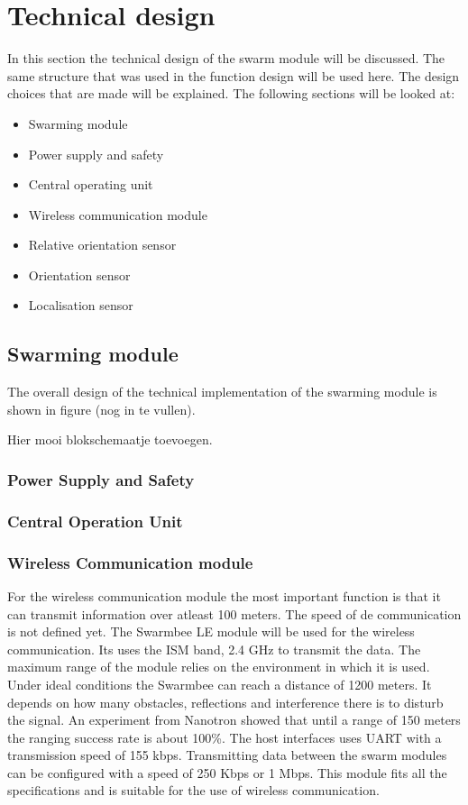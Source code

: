 \documentclass[10pt,a4paper]{article}
\begin{document}
\newpage

\section{Technical design}
 
In this section the technical design of the swarm module will be discussed. The same structure that was used in the function design will be used here. The design choices that are made will be explained. The following sections will be looked at: 


\begin{itemize}
\setlength\itemsep{0em}
\item Swarming module
\item Power supply and safety
\item Central operating unit
\item Wireless communication module
\item Relative orientation sensor
\item Orientation sensor
\item Localisation sensor
\end{itemize}

\subsection{Swarming module}

The overall design of the technical implementation of the swarming module is shown in figure (nog in te vullen). 

Hier mooi blokschemaatje toevoegen. 


\subsubsection{Power Supply and Safety}

\subsubsection{Central Operation Unit}

\subsubsection{Wireless Communication module}

For the wireless communication module the most important function is that it can transmit information over atleast 100 meters. The speed of de communication is not defined yet. The Swarmbee LE module will be used for the wireless communication. Its uses the ISM band, 2.4 GHz to transmit the data. The maximum range of the module relies on the environment in which it is used. Under ideal conditions the Swarmbee can reach a distance of 1200 meters. It depends on how many obstacles, reflections and interference there is to disturb the signal. An experiment from Nanotron showed that until a range of 150 meters the ranging success rate is about 100\%. The host interfaces uses UART with a transmission speed of 155 kbps. Transmitting data between the swarm modules can be configured with a speed of 250 Kbps or 1 Mbps. This module fits all the specifications and is suitable for the use of wireless communication. 
\end{document}
